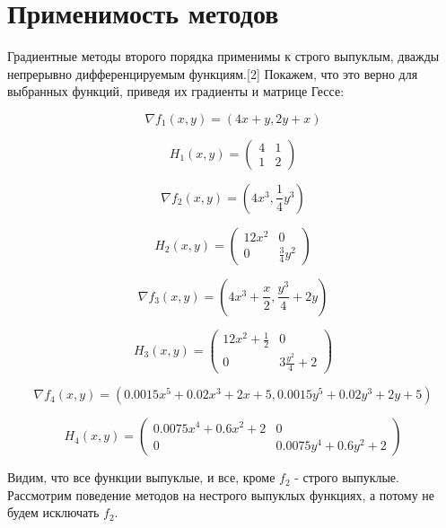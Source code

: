 \section{Применимость методов}
\label{sec:applicability}

Градиентные методы второго порядка применимы к строго выпуклым, дважды непрерывно дифференцируемым функциям.[2]
Покажем, что это верно для выбранных функций, приведя их градиенты и матрице Гессе:

\begin{equation}
    \nabla f_1(x, y) = (4x + y,  2y + x)
    \label{eq:func_1_grad}
\end{equation}

\begin{equation}
    H_1(x, y) =
    \begin{pmatrix}
        4 & 1\\
        1 & 2
    \end{pmatrix}
    \label{eq:func_1_hesse}
\end{equation}

\begin{equation}
    \nabla f_2(x, y) = (
        4x^3,  \frac{1}{4}y^3
    )
    \label{eq:func_2_grad}
\end{equation}

\begin{equation}
    H_2(x, y) =
    \begin{pmatrix}
            12 x^2 & 0\\
            0 & \frac{3}{4}y^2
    \end{pmatrix}
    \label{eq:func_2_hesse}
\end{equation}

\begin{equation}
    \nabla f_3(x, y) = (4x^3 + \frac{x}{2},  \frac{y^3}{4} + 2y)
    \label{eq:func_3_grad}
\end{equation}

\begin{equation}
    H_3(x, y) =
    \begin{pmatrix}
        12 x^2 + \frac{1}{2} & 0\\
        0 & 3\frac{y^2}{4} + 2
    \end{pmatrix}
    \label{eq:func_3_hesse}
\end{equation}

\begin{equation}
    \nabla f_4(x, y) = (0.0015x^5 + 0.02x^3 + 2x + 5,  0.0015y^5 + 0.02y^3 + 2y + 5)
    \label{eq:func_4_grad}
\end{equation}

\begin{equation}
    H_4(x, y) =
    \begin{pmatrix}
        0.0075x^4 + 0.6x^2 + 2 & 0\\
        0 & 0.0075y^4 + 0.6y^2 + 2
    \end{pmatrix}
    \label{eq:func_4_hesse}
\end{equation}

Видим, что все функции выпуклые, и все, кроме $f_2$ - строго выпуклые.
Рассмотрим поведение методов на нестрого выпуклых функциях, а потому не будем исключать $f_2$.